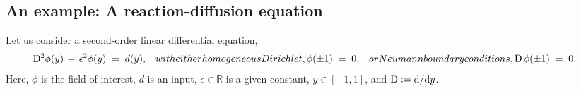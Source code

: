 \documentclass[%
secnumarabic,%
 amssymb, amsmath,%
 aps,prf,superscriptaddress,longbibliography
frontmatterverbose,
]{revtex4-2}
\newcommand{\DefinedAs}[0]{\mathrel{\mathop:}=}
\begin{document}
	\vspace*{-3ex}
	\subsection{An example: A reaction-diffusion equation}
	
		\vspace*{-2ex}
Let us consider a second-order linear differential equation,
\begin{subequations}
  \begin{align}
    \D^2 \phi (y) \,-\, \epsilon^2 \phi (y) \;&=\; d (y),
    \label{eq:rndDir}
  \end{align}  
with either homogeneous Dirichlet,
  \begin{align}
    \phi (\pm 1) \;&=\; 0,\label{eq:rndDira}
    \end{align}
or Neumann boundary conditions,
	\begin{align}   
    \D\, \phi (\pm 1) \;&=\; 0.\label{eq:rndNub}
  \end{align}
\end{subequations}
Here, $\phi$ is the field of interest, $d$ is an input, $\epsilon \in \mathbb{R}$ is a given constant, $y \in [-1, 1]$, and $\D \DefinedAs \mathrm d / \mathrm dy$.
\end{document}
